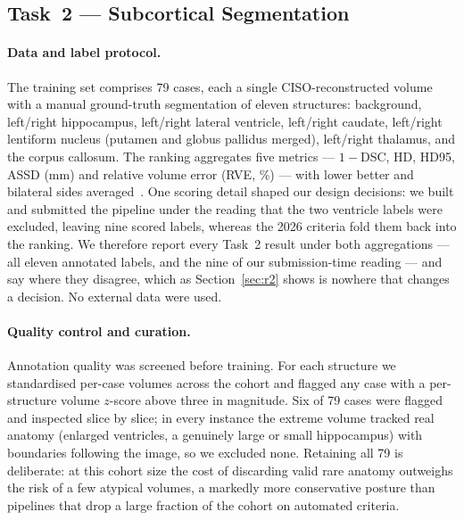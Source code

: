 \documentclass[runningheads]{llncs}
\begin{document}
\subsection{Task~2 --- Subcortical Segmentation}
\label{sec:m2}

\paragraph{Data and label protocol.}
The training set comprises 79 cases, each a single CISO-reconstructed volume with
a manual ground-truth segmentation of eleven structures: background, left/right
hippocampus, left/right lateral ventricle, left/right caudate, left/right
lentiform nucleus (putamen and globus pallidus merged), left/right thalamus, and
the corpus callosum. The ranking aggregates five metrics --- $1-$DSC, HD, HD95, ASSD (mm)
and relative volume error (RVE, \%) --- with lower better and bilateral sides
averaged~\cite{maierhein2024metrics}. One scoring detail shaped our design decisions:
we built and submitted the pipeline under the reading that the two ventricle labels
were excluded, leaving nine scored labels, whereas the 2026 criteria fold them back
into the ranking. We therefore report every Task~2 result under both aggregations ---
all eleven annotated labels, and the nine of our submission-time reading --- and say
where they disagree, which as Section~\ref{sec:r2} shows is nowhere that changes a
decision. No external data were used.

\paragraph{Quality control and curation.}
Annotation quality was screened before training. For each structure we
standardised per-case volumes across the cohort and flagged any case with a
per-structure volume $z$-score above three in magnitude. Six of 79 cases were
flagged and inspected slice by slice; in every instance the extreme volume
tracked real anatomy (enlarged ventricles, a genuinely large or small
hippocampus) with boundaries following the image, so we excluded none. Retaining
all 79 is deliberate: at this cohort size the cost of discarding valid rare
anatomy outweighs the risk of a few atypical volumes, a markedly more
conservative posture than pipelines that drop a large fraction of the cohort on
automated criteria.
\end{document}
